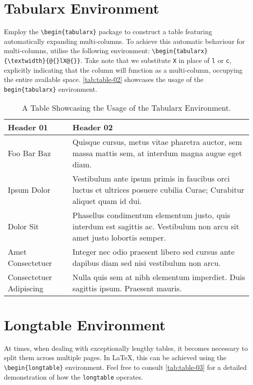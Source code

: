 \section{Tabularx Environment}
Employ the \verb|\begin{tabularx}| package to construct a table featuring automatically expanding multi-columns. To achieve this automatic behaviour for multi-columns, utilise the following environment: \verb|\begin{tabularx}{\textwidth}{@{}lX@{}}|. Take note that we substitute \verb|X| in place of \verb|l| or \verb|c|, explicitly indicating that the column will function as a multi-column, occupying the entire available space. \autoref{tab:table-02} showcases the usage of the \verb|begin{tabularx}| environment.

\begin{table}[!htpb]
    \caption{A Table Showcasing the Usage of the Tabularx Environment.}
    \label{tab:table-02}
    \begin{tabularx}{\textwidth}{@{}lX@{}}
        \toprule
        Header 01 & Header 02 \\ 
        \midrule
        Foo Bar Baz & Quisque cursus, metus vitae pharetra auctor, sem massa mattis sem, at interdum magna augue eget diam. \\
        Ipsum Dolor & Vestibulum ante ipsum primis in faucibus orci luctus et ultrices posuere cubilia Curae; Curabitur aliquet quam id dui. \\
        Dolor Sit & Phasellus condimentum elementum justo, quis interdum est sagittis ac. Vestibulum non arcu sit amet justo lobortis semper. \\
        Amet Consectetuer & Integer nec odio praesent libero sed cursus ante dapibus diam sed nisi vestibulum non arcu. \\
        Consectetuer Adipiscing & Nulla quis sem at nibh elementum imperdiet. Duis sagittis ipsum. Praesent mauris. \\
        \bottomrule
    \end{tabularx}
\end{table}

\section{Longtable Environment}
At times, when dealing with exceptionally lengthy tables, it becomes necessary to split them across multiple pages. In \LaTeX, this can be achieved using the \verb|\begin{longtable}| environment. Feel free to consult \autoref{tab:table-03} for a detailed demonstration of how the \verb|longtable| operates.

